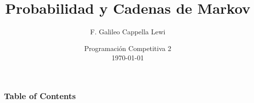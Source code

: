 \documentclass{beamer}
\title{Probabilidad y Cadenas de Markov}
\author{F. Galileo Cappella Lewi}
\date[PC2 2023]{Programación Competitiva 2\\\today}
\begin{document}
\frame{\titlepage}

\begin{frame}
  \frametitle{Table of Contents}
  \tableofcontents
\end{frame}






\end{document}
